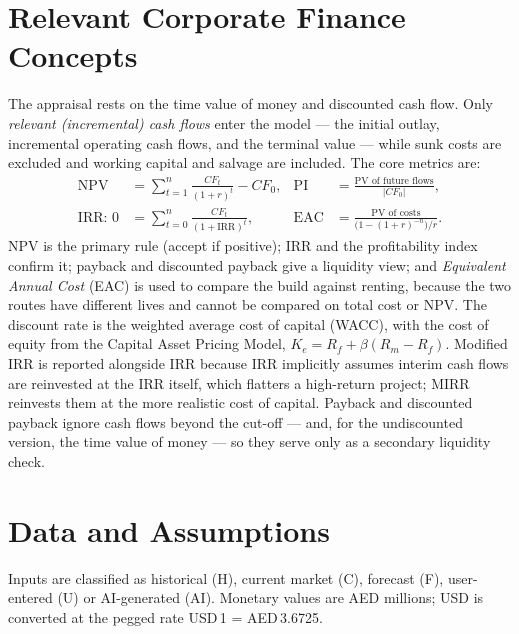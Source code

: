 \documentclass[12pt,a4paper]{article}
\begin{document}
\section{Relevant Corporate Finance Concepts}
The appraisal rests on the time value of money and discounted cash flow. Only \emph{relevant
(incremental) cash flows} enter the model --- the initial outlay, incremental operating cash
flows, and the terminal value --- while sunk costs are excluded and working capital and salvage
are included. The core metrics are:
\begin{align*}
\text{NPV} &= \sum_{t=1}^{n}\frac{CF_t}{(1+r)^t}-CF_0, &
\text{PI} &= \frac{\text{PV of future flows}}{|CF_0|},\\
\text{IRR: } 0 &= \sum_{t=0}^{n}\frac{CF_t}{(1+\text{IRR})^t}, &
\text{EAC} &= \frac{\text{PV of costs}}{\big(1-(1+r)^{-n}\big)/r}.
\end{align*}
NPV is the primary rule (accept if positive); IRR and the profitability index confirm it; payback
and discounted payback give a liquidity view; and \emph{Equivalent Annual Cost} (EAC) is used to
compare the build against renting, because the two routes have different lives and cannot be
compared on total cost or NPV. The discount rate is the weighted average cost of capital (WACC),
with the cost of equity from the Capital Asset Pricing Model,
$K_e = R_f + \beta(R_m-R_f)$. Modified IRR is reported alongside IRR because IRR implicitly
assumes interim cash flows are reinvested at the IRR itself, which flatters a high-return project;
MIRR reinvests them at the more realistic cost of capital. Payback and discounted payback ignore
cash flows beyond the cut-off --- and, for the undiscounted version, the time value of money ---
so they serve only as a secondary liquidity check.

\section{Data and Assumptions}
Inputs are classified as historical (H), current market (C), forecast (F), user-entered (U) or
AI-generated (AI). Monetary values are AED millions; USD is converted at the pegged rate
USD\,1 = AED\,3.6725.
\end{document}
